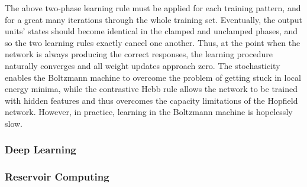 The above two-phase learning rule must be applied for each training pattern, and for a great many iterations through the whole training set. Eventually, the output units' states should become identical in the clamped and unclamped phases, and so the two learning rules exactly cancel one another. Thus, at the point when the network is always producing the correct responses, the learning procedure naturally converges and all weight updates approach zero.
The stochasticity enables the Boltzmann machine to overcome the problem of getting stuck in local energy minima, while the contrastive Hebb rule allows the network to be trained with hidden features and thus overcomes the capacity limitations of the Hopfield network. However, in practice, learning in the Boltzmann machine is hopelessly slow.

\subsubsection{Deep Learning}



\subsubsection{Reservoir Computing}
\cite{jaha2004}
